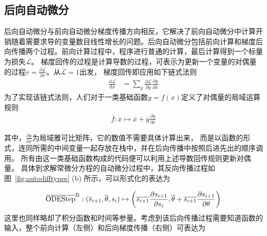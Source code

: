\documentclass[A4,twoside,fontset=ubuntu,UTF8]{ctexart}
\def\D{\mathrm{d}}
\begin{document}
\subsection{后向自动微分}
后向自动微分与前向自动微分梯度传播方向相反，它解决了前向自动微分中计算开销随着需要求导的变量数目线性增长的问题。后向自动微分包括前向计算和梯度后向传播两个过程。前向计算过程中，程序进行普通的计算，最后计算得到一个标量为损失$\mathcal{L}$。
梯度回传的过程是计算导数的过程，可表示为更新一个变量的对偶量的过程$\overline{v} = \frac{\partial \mathcal{L}}{\partial v}$。从$\overline{\mathcal L} = 1$出发，
梯度回传即应用如下链式法则
\begin{align*}
    \frac{\D \mathcal{L}}{\D x} &= \sum_y\frac{\partial \mathcal{L}}{\partial y}\frac{\partial y}{\partial x}
\end{align*}
为了实现该链式法则，人们对于一类基础函数$y=f(x)$定义了对偶量的局域运算规则
\begin{align*}
    \overline f: \overline x \mapsto \overline x + \overline y\frac{\partial y}{\partial x}
\end{align*}

其中，$\frac{\partial y}{\partial x}$为局域雅可比矩阵，它的数值不需要具体计算出来，
而是以函数的形式，连同所需的中间变量一起存放在栈中，并在后向传播中按照后进先出的顺序调用。
所有由这一类基础函数构成的代码便可以利用上述导数回传规则更新对偶量。
具体到求解常微分方程的自动微分过程中，其反向传播过程如图~\ref{fig:autodifftypes} (b) 所示，可以形式化的表达为

\begin{align*}
    \overline{\rm ODEStep}^{\rm B} : (\overline s_{i+1}, \overline\theta, s_i) \mapsto %
    \left(\overline{s_{i+1}}\frac{\partial s_{i+1}}{\partial s_{i}}
    ,\overline{\theta} + \overline{s_{i+1}}\frac{\partial s_{i+1}}{\partial \theta}\right)%
\end{align*}
这里也同样略却了积分函数和时间等参量。考虑到该后向传播过程需要知道函数的输入，整个前向计算（左侧）和后向梯度传播（右侧）可表达为
\end{document}

